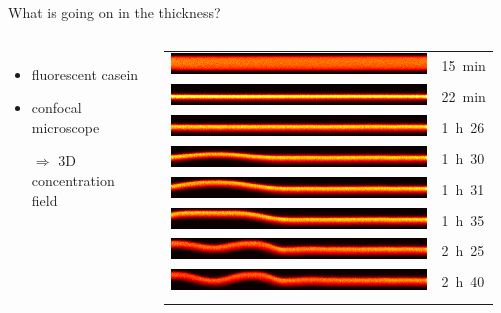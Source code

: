 \begin{frame}{What is going on in the thickness?}
\begin{columns}
\begin{itemize}
\item fluorescent casein
\item confocal microscope
\item[$\Rightarrow$] 3D concentration field
\end{itemize}

\setlength{\tabcolsep}{1pt}
\begin{tabular}{p{\columnwidth}l}
	\includegraphics[width=\columnwidth, height=0.061\columnwidth]{coupe_cloque_t000.png}& \SI{15}{\minute}\\
	\includegraphics[width=\columnwidth, height=0.061\columnwidth]{coupe_cloque_t011.png} & \SI{22}{\minute}\\
	\includegraphics[width=\columnwidth, height=0.061\columnwidth]{coupe_cloque_t110.png} & \SI{1}{\hour}~26\onslide<2->{\\
	\includegraphics[width=\columnwidth, height=0.061\columnwidth]{coupe_cloque_t116.png} & \SI{1}{\hour}~30\\
	\includegraphics[width=\columnwidth, height=0.061\columnwidth]{coupe_cloque_t117.png} & \SI{1}{\hour}~31\\
	\includegraphics[width=\columnwidth, height=0.061\columnwidth]{coupe_cloque_t123.png} & \SI{1}{\hour}~35\\
	\includegraphics[width=\columnwidth, height=0.061\columnwidth]{coupe_cloque_t200.png} & \SI{2}{\hour}~25\\
	\includegraphics[width=\columnwidth, height=0.061\columnwidth]{coupe_cloque_t221.png} & \SI{2}{\hour}~40\\}
\end{tabular}


\end{columns}
\end{frame}
